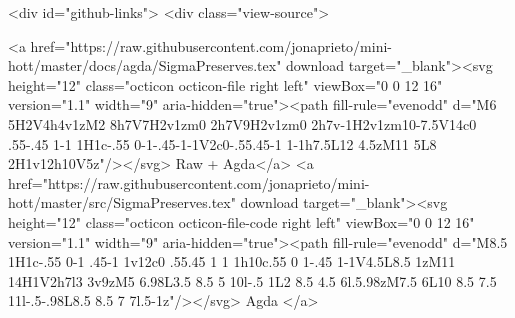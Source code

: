  <div id="github-links">
    <div class="view-source">
      
        <a href="https://raw.githubusercontent.com/jonaprieto/mini-hott/master/docs/agda/SigmaPreserves.tex" download target="_blank"><svg height="12" class="octicon octicon-file right left" viewBox="0 0 12 16" version="1.1" width="9" aria-hidden="true"><path fill-rule="evenodd" d="M6 5H2V4h4v1zM2 8h7V7H2v1zm0 2h7V9H2v1zm0 2h7v-1H2v1zm10-7.5V14c0 .55-.45 1-1 1H1c-.55 0-1-.45-1-1V2c0-.55.45-1 1-1h7.5L12 4.5zM11 5L8 2H1v12h10V5z"/></svg> Raw + Agda</a>
        <a href="https://raw.githubusercontent.com/jonaprieto/mini-hott/master/src/SigmaPreserves.tex" download target="_blank"><svg height="12" class="octicon octicon-file-code right left" viewBox="0 0 12 16" version="1.1" width="9" aria-hidden="true"><path fill-rule="evenodd" d="M8.5 1H1c-.55 0-1 .45-1 1v12c0 .55.45 1 1 1h10c.55 0 1-.45 1-1V4.5L8.5 1zM11 14H1V2h7l3 3v9zM5 6.98L3.5 8.5 5 10l-.5 1L2 8.5 4.5 6l.5.98zM7.5 6L10 8.5 7.5 11l-.5-.98L8.5 8.5 7 7l.5-1z"/></svg> Agda </a>
      
